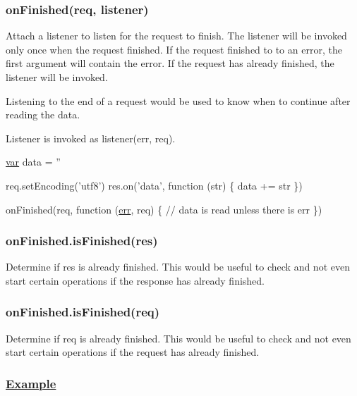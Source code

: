 \subsubsection*{on\+Finished(req, listener)}

Attach a listener to listen for the request to finish. The listener will be invoked only once when the request finished. If the request finished to to an error, the first argument will contain the error. If the request has already finished, the listener will be invoked.

Listening to the end of a request would be used to know when to continue after reading the data.

Listener is invoked as {\ttfamily listener(err, req)}.


\begin{DoxyCode}
\hyperlink{018__def_8c_a335628f2e9085305224b4f9cc6e95ed5}{var} data = \textcolor{stringliteral}{''}

req.setEncoding(\textcolor{stringliteral}{'utf8'})
res.on(\textcolor{stringliteral}{'data'}, \textcolor{keyword}{function} (str) \{
  data += str
\})

onFinished(req, \textcolor{keyword}{function} (\hyperlink{message_8cpp_aede5746344fdce99647541101eaa7f06}{err}, req) \{
  \textcolor{comment}{// data is read unless there is err}
\})
\end{DoxyCode}


\subsubsection*{on\+Finished.\+is\+Finished(res)}

Determine if {\ttfamily res} is already finished. This would be useful to check and not even start certain operations if the response has already finished.

\subsubsection*{on\+Finished.\+is\+Finished(req)}

Determine if {\ttfamily req} is already finished. This would be useful to check and not even start certain operations if the request has already finished.

\subsubsection*{\hyperlink{struct_example}{Example}}

